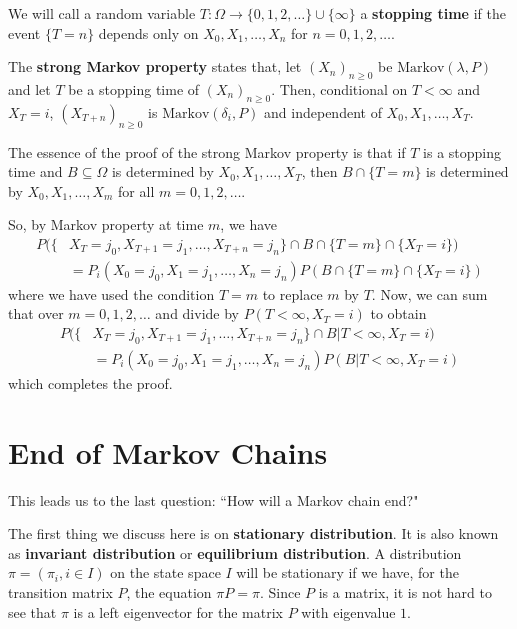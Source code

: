 \documentclass[11pt, a4paper, oneside]{book}
\theoremstyle{definition}
\newcommand{\markov}[2]{\text{Markov}(#1, #2)}
\begin{document}
\noindent We will call a random variable $T:\Omega \to \{ 0,1,2,\dots\} \cup \{ \infty\}$ a \textbf{stopping time} if the event $\{ T=n\}$ depends only on $X_0, X_1, \dots ,X_n$ for $n = 0, 1, 2, \dots$. 

\noindent The \textbf{strong Markov property} states that, let $(X_n)_{n \ge 0}$ be $\markov{\lambda}{P}$ and let $T$ be a stopping time of $(X_n)_{n \ge 0}$. Then, conditional on $T < \infty$ and $X_T = i$, $(X_{T+n})_{n \ge 0}$ is $\markov{\delta_i}{P}$ and independent of $X_0, X_1, \dots ,X_T$.

\noindent The essence of the proof of the strong Markov property is that if $T$ is a stopping time and $B \subseteq \Omega$ is determined by $X_0, X_1, \dots ,X_T$, then $B \cap \{ T = m \}$ is determined by $X_0, X_1, \dots ,X_m$ for all $m = 0, 1, 2, \dots$. 

\noindent So, by Markov property at time $m$, we have
\begin{equation*}
\begin{split}
P(\{&X_T = j_0, X_{T+1} = j_1, \dots, X_{T+n} = j_n\} \cap B \cap \{ T = m\} \cap \{ X_T = i\}) \\
&= P_i(X_0 = j_0, X_{1} = j_1, \dots, X_{n} = j_n)P(B\cap \{ T = m\} \cap \{ X_T = i\})
\end{split}
\end{equation*}
where we have used the condition $T = m$ to replace $m$ by $T$. Now, we can sum that over $m = 0, 1, 2, \dots$ and divide by $P(T < \infty, X_T =i)$ to obtain 
\begin{equation*}
\begin{split}
P(\{&X_T = j_0, X_{T+1} = j_1, \dots, X_{T+n} = j_n\} \cap B \vert T<\infty, X_T = i) \\
&= P_i(X_0 = j_0, X_{1} = j_1, \dots, X_{n} = j_n)P(B \vert T < \infty, X_T = i)
\end{split}
\end{equation*}
which completes the proof.

\section{End of Markov Chains}

\noindent This leads us to the last question: ``How will a Markov chain end?"

\noindent The first thing we discuss here is on \textbf{stationary distribution}. It is also known as \textbf{invariant distribution} or \textbf{equilibrium distribution}. A distribution $\pi = (\pi_i, i \in I)$ on the state space $I$ will be stationary if we have, for the transition matrix $P$, the equation $\pi P = \pi$. Since $P$ is a matrix, it is not hard to see that $\pi$ is a left eigenvector for the matrix $P$ with eigenvalue $1$. 
\end{document}
